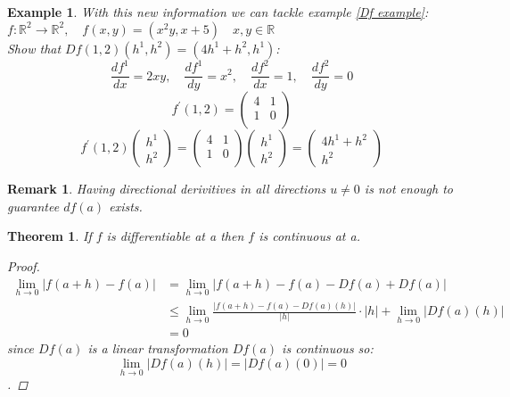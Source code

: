 \documentclass[11pt]{article}
\def\RR{\mathbb{R}}
\newtheorem{theorem}{Theorem}[section]
\newtheorem{example}{Example}[section]
\newtheorem*{remark}{Remark}
\begin{document}
\begin{example} With this new information we can tackle example \ref{Df example}:\\
$f:\RR^{2} \rightarrow \RR^{2}, \quad f(x,y)=(x^{2}y,x+5) \quad x,y \in \RR$\\
Show that $Df(1,2)(h^{1}, h^{2})=(4h^{1} +  h^{2}, h^{1})$:
\[\frac{df^{1}}{dx} = 2xy, \quad \frac{df^{1}}{dy} = x^{2}, \quad \frac{df^{2}}{dx} = 1, \quad \frac{df^{2}}{dy} = 0\]
\[f^{'}(1,2)=\begin{pmatrix}
 4&1 \\
  1&0 \\
 \end{pmatrix}\]
\[f^{'}(1,2) \left(\!\! \begin{array}{c} h^{1} \\  h^{2} \end{array}\!\! \right)= \begin{pmatrix}
 4&1 \\
  1&0 \\
 \end{pmatrix}\!\!\! \left(\!\! \begin{array}{c} h^{1} \\  h^{2} \end{array}\!\! \right)=  \left(\!\!\! \begin{array}{c} 4h^{1} + h^{2}\\  h^{2} \end{array}\!\! \right)\]
\end{example}

\begin{remark}
Having  directional derivitives in all directions $u\neq 0$ is not enough to guarantee $df(a)$ exists.
\end{remark}

\begin{theorem}
If $f$ is differentiable at a then $f$ is continuous at a.
\begin{proof}
\begin{align*}
\lim_{h \to 0}|f(a+h)-f(a)| &= \lim_{h \to 0}|f(a+h)-f(a) -Df(a) + Df(a)|\\
&\leq \lim_{h \to 0}\frac{|f(a+h)-f(a) -Df(a)(h)|}{|h|}\cdot|h| + \lim_{h \to 0}| Df(a)(h)|\\ 
&= 0 
\end{align*}
since $Df(a)$ is a linear transformation $Df(a)$ is continuous so: \[\lim_{h \to 0}| Df(a)(h)| = | Df(a)(0)| = 0\].
\end{proof}
\end{theorem}
\end{document}
